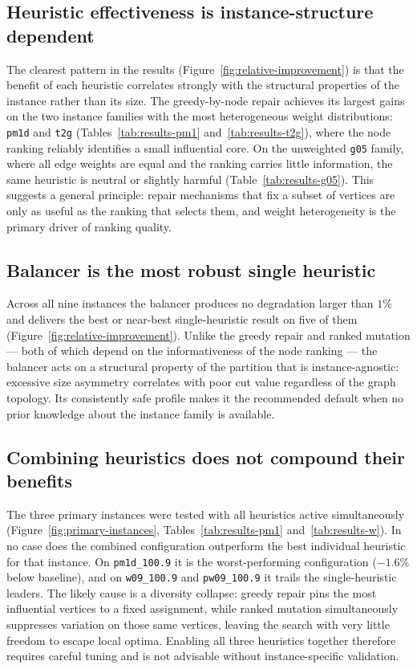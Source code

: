 \documentclass[12pt]{article}
\begin{document}
\subsection{Heuristic effectiveness is instance-structure dependent}

The clearest pattern in the results (Figure~\ref{fig:relative-improvement}) is
that the benefit of each heuristic correlates strongly with the structural
properties of the instance rather than its size.
The greedy-by-node repair achieves its largest gains on the two instance
families with the most heterogeneous weight distributions: \texttt{pm1d} and
\texttt{t2g} (Tables~\ref{tab:results-pm1} and~\ref{tab:results-t2g}), where
the node ranking reliably identifies a small influential core.
On the unweighted \texttt{g05} family, where all edge weights are equal and the
ranking carries little information, the same heuristic is neutral or slightly
harmful (Table~\ref{tab:results-g05}).
This suggests a general principle: repair mechanisms that fix a subset of
vertices are only as useful as the ranking that selects them, and weight
heterogeneity is the primary driver of ranking quality.

\subsection{Balancer is the most robust single heuristic}

Across all nine instances the balancer produces no degradation larger than
$1\%$ and delivers the best or near-best single-heuristic result on five of
them (Figure~\ref{fig:relative-improvement}).
Unlike the greedy repair and ranked mutation — both of which depend on the
informativeness of the node ranking — the balancer acts on a structural
property of the partition that is instance-agnostic: excessive size asymmetry
correlates with poor cut value regardless of the graph topology.
Its consistently safe profile makes it the recommended default when no prior
knowledge about the instance family is available.

\subsection{Combining heuristics does not compound their benefits}

The three primary instances were tested with all heuristics active simultaneously
(Figure~\ref{fig:primary-instances}, Tables~\ref{tab:results-pm1}
and~\ref{tab:results-w}).
In no case does the combined configuration outperform the best individual
heuristic for that instance.
On \texttt{pm1d\_100.9} it is the worst-performing configuration ($-1.6\%$
below baseline), and on \texttt{w09\_100.9} and \texttt{pw09\_100.9} it
trails the single-heuristic leaders.
The likely cause is a diversity collapse: greedy repair pins the most
influential vertices to a fixed assignment, while ranked mutation simultaneously
suppresses variation on those same vertices, leaving the search with very
little freedom to escape local optima.
Enabling all three heuristics together therefore requires careful tuning and
is not advisable without instance-specific validation.
\end{document}
